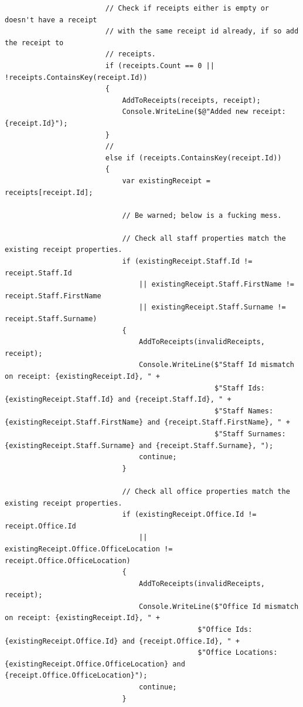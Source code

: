 \documentclass{article}
\begin{document}
\begin{lstlisting}
                        // Check if receipts either is empty or doesn't have a receipt 
                        // with the same receipt id already, if so add the receipt to 
                        // receipts.
                        if (receipts.Count == 0 || !receipts.ContainsKey(receipt.Id))
                        {
                            AddToReceipts(receipts, receipt);
                            Console.WriteLine($@"Added new receipt: {receipt.Id}");
                        }
                        // 
                        else if (receipts.ContainsKey(receipt.Id))
                        {
                            var existingReceipt = receipts[receipt.Id];

                            // Be warned; below is a fucking mess.

                            // Check all staff properties match the existing receipt properties.
                            if (existingReceipt.Staff.Id != receipt.Staff.Id
                                || existingReceipt.Staff.FirstName != receipt.Staff.FirstName
                                || existingReceipt.Staff.Surname != receipt.Staff.Surname)
                            {
                                AddToReceipts(invalidReceipts, receipt);
                                Console.WriteLine($"Staff Id mismatch on receipt: {existingReceipt.Id}, " +
                                                  $"Staff Ids: {existingReceipt.Staff.Id} and {receipt.Staff.Id}, " +
                                                  $"Staff Names: {existingReceipt.Staff.FirstName} and {receipt.Staff.FirstName}, " +
                                                  $"Staff Surnames: {existingReceipt.Staff.Surname} and {receipt.Staff.Surname}, ");
                                continue;
                            }

                            // Check all office properties match the existing receipt properties.
                            if (existingReceipt.Office.Id != receipt.Office.Id
                                || existingReceipt.Office.OfficeLocation != receipt.Office.OfficeLocation)
                            {
                                AddToReceipts(invalidReceipts, receipt);
                                Console.WriteLine($"Office Id mismatch on receipt: {existingReceipt.Id}, " +
                                              $"Office Ids: {existingReceipt.Office.Id} and {receipt.Office.Id}, " +
                                              $"Office Locations: {existingReceipt.Office.OfficeLocation} and {receipt.Office.OfficeLocation}");
                                continue;
                            }


\end{lstlisting}
\end{document}
